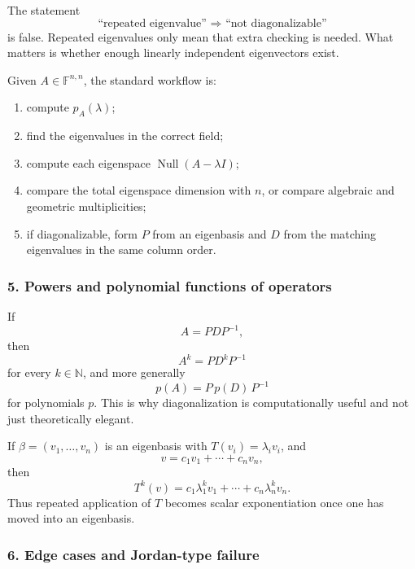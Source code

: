 \begin{commonmistake}[title={Common Mistake: repeated eigenvalue does not force failure}]
The statement
\[
\text{``repeated eigenvalue'' } \Rightarrow \text{ ``not diagonalizable''}
\]
is false. Repeated eigenvalues only mean that extra checking is needed. What matters is whether enough linearly independent eigenvectors exist.
\end{commonmistake}

\begin{examtip}[title={Exam Focus: complete diagonalizability workflow}]
Given \(A\in\mathbb{F}^{n,n}\), the standard workflow is:
\begin{enumerate}[leftmargin=*]
    \item compute \(p_A(\lambda)\);
    \item find the eigenvalues in the correct field;
    \item compute each eigenspace \(\operatorname{Null}(A-\lambda I)\);
    \item compare the total eigenspace dimension with \(n\), or compare algebraic and geometric multiplicities;
    \item if diagonalizable, form \(P\) from an eigenbasis and \(D\) from the matching eigenvalues in the same column order.
\end{enumerate}
\end{examtip}

\subsubsection*{5. Powers and polynomial functions of operators}

If
\[
A=PDP^{-1},
\]
then
\[
A^k = PD^kP^{-1}
\]
for every \(k\in\mathbb{N}\), and more generally
\[
p(A)=P\,p(D)\,P^{-1}
\]
for polynomials \(p\). This is why diagonalization is computationally useful and not just theoretically elegant.

\begin{examplebox}[title={Worked Illustration: why diagonalization simplifies iteration}]
If \(\beta=(v_1,\dots,v_n)\) is an eigenbasis with \(T(v_i)=\lambda_i v_i\), and
\[
v=c_1v_1+\cdots+c_nv_n,
\]
then
\[
T^k(v)=c_1\lambda_1^k v_1+\cdots+c_n\lambda_n^k v_n.
\]
Thus repeated application of \(T\) becomes scalar exponentiation once one has moved into an eigenbasis.
\end{examplebox}

\subsubsection*{6. Edge cases and Jordan-type failure}

